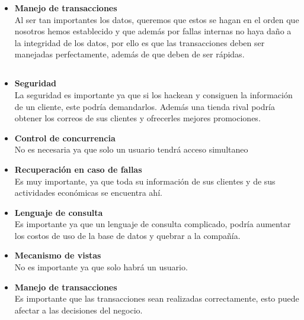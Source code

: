 \documentclass{article}
\begin{document}
\begin{itemize}
        A veces los conceptos más técnicos como es el encapsulamiento, llegan a las organizaciones ya que provee ciertas cosas, en este caso, queremos que para que los distintos miembros de la organización tengan acceso a la información que ellos necesitan, es por eso que necesitamos un mecanismo para ofrecerles lo que necesitan, y nada más.\\
        \item\textbf{Manejo de transacciones}\\
        Al ser tan importantes los datos, queremos que estos se hagan en el orden que nosotros hemos establecido y que además por fallas internas no haya daño a la integridad de los datos, por ello es que las transacciones deben ser manejadas perfectamente, además de que deben de ser rápidas.
    \end{itemize}
    \subsection{}
    \begin{itemize}
        \item \textbf{Seguridad}
        \\ La seguridad es importante ya que si los hackean y consiguen la información de un cliente, este podría demandarlos. Además una tienda rival podría obtener los correos de sus clientes y ofrecerles mejores promociones.
        \item\textbf{Control de concurrencia}
        \\No es necesaria ya que solo un usuario tendrá acceso simultaneo
        \item \textbf{Recuperación en caso de fallas}
        \\Es muy importante, ya que toda su información de sus clientes y de sus actividades económicas se encuentra ahí.
        \item\textbf{Lenguaje de consulta} \\
       Es importante ya que un lenguaje de consulta complicado, podría aumentar los costos de uso de la base de datos y quebrar a la compañía.
        \item\textbf{ Mecanismo de vistas} \\
       No es importante ya que solo habrá un usuario.
        \item\textbf{Manejo de transacciones}\\
       Es importante que las transacciones sean realizadas correctamente, esto puede afectar a las decisiones del negocio.
    \end{itemize}
\end{document}

